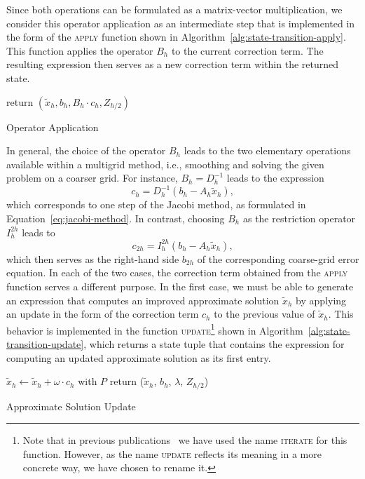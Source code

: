 Since both operations can be formulated as a matrix-vector multiplication, we consider this operator application as an intermediate step that is implemented in the form of the \textsc{apply} function shown in Algorithm~\ref{alg:state-transition-apply}.
This function applies the operator $B_h$ to the current correction term. 
The resulting expression then serves as a new correction term within the returned state.
\begin{algorithm}
	\begin{algorithmic}
		\State return $(\tilde{x}_h, b_h, B_h\cdot c_h, Z_{h/2})$
		\EndFunction
	\end{algorithmic}
\caption{Operator Application}
\label{alg:state-transition-apply}
\end{algorithm}
In general, the choice of the operator $B_h$ leads to the two elementary operations available within a multigrid method, i.e., smoothing and solving the given problem on a coarser grid.
For instance, $B_h = D_h^{-1}$ leads to the expression
\begin{equation*}
	c_h = D_h^{-1} (b_h - A_h \tilde{x}_h),
\end{equation*}
which corresponds to one step of the Jacobi method, as formulated in Equation~\eqref{eq:jacobi-method}.
In contrast, choosing $B_h$ as the restriction operator $I_h^{2h}$ leads to
\begin{equation*}
	c_{2h} = I_{h}^{2h} (b_h - A_h \tilde{x}_h),
\end{equation*}
which then serves as the right-hand side $b_{2h}$ of the corresponding coarse-grid error equation.
In each of the two cases, the correction term obtained from the \textsc{apply} function serves a different purpose.
In the first case, we must be able to generate an expression that computes an improved approximate solution $\tilde{x}_h$ by applying an update in the form of the correction term $c_h$ to the previous value of $\tilde{x}_h$. 
This behavior is implemented in the function \textsc{update}\footnote{Note that in previous publications~\cite{schmitt2020constructing,schmitt2021evostencils} we have used the name \textsc{iterate} for this function. However, as the name \textsc{update} reflects its meaning in a more concrete way, we have chosen to rename it.} shown in Algorithm~\ref{alg:state-transition-update}, which returns a state tuple that contains the expression for computing an updated approximate solution as its first entry.
\begin{algorithm}
	\begin{algorithmic}
		\Function{update}{$\omega$, $P$, ($\tilde{x}_h$, $b_h$, $c_h$, $Z_{h/2}$)}
			\State $\tilde{x}_h \gets \tilde{x}_h + \omega \cdot c_h$ with $P$
			\State return ($\tilde{x}_h$, $b_h$, $\lambda$, $Z_{h/2}$) 
		\EndFunction
	\end{algorithmic}
 \caption{Approximate Solution Update}
\label{alg:state-transition-update}
\end{algorithm}
